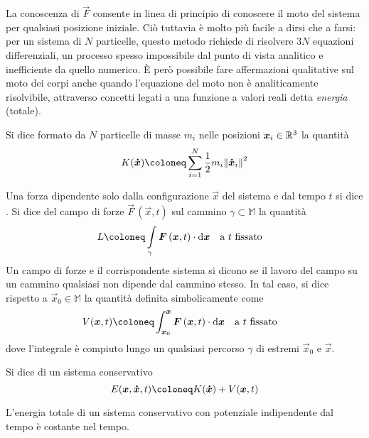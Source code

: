 La conoscenza di $\vec{F}$ consente in linea di principio di conoscere il moto del sistema per qualsiasi posizione iniziale. Ciò tuttavia è molto più facile a dirsi che a farsi: per un sistema di $N$ particelle, questo metodo richiede di risolvere $3N$ equazioni differenziali, un processo spesso impossibile dal punto di vista analitico e inefficiente da quello numerico. È però possibile fare affermazioni qualitative sul moto dei corpi anche quando l'equazione del moto non è analiticamente risolvibile, attraverso concetti legati a una funzione a valori reali detta \emph{energia} (totale).
\begin{definition}
  Si dice  formato da $N$ particelle di masse $m_i$ nelle posizioni $\boldsymbol{x}_i \in \mathbb{R}^3$ la quantità \begin{equation}
    K(\vec{\dot{x}}) \defeq \sum_{i=1}^{N} \frac{1}{2}m_i\norm{\vec{\dot{x}}_i}^2
  \end{equation} 
\end{definition}
\begin{definition}
  Una forza dipendente solo dalla configurazione $\vec{x}$ del sistema e dal tempo $t$ si dice . Si dice  del campo di forze $\vec{F}\, (\vec{x},t)$ sul cammino $\gamma \subset \mathbb{M}$ la quantità \begin{equation}
  L \defeq \int\limits_{\gamma} \vec{F}\,(\vec{x},t)\cdot \dd \vec{x} \qqtext{a $t$ fissato}
  \end{equation} 
  Un campo di forze e il corrispondente sistema si dicono  se il lavoro del campo su un cammino qualsiasi non dipende dal cammino stesso. In tal caso, si dice  rispetto a $\vec{x}_0 \in \mathbb{M}$ la quantità definita simbolicamente come \begin{equation}
  V(\vec{x},t) \defeq \int_{\vec{x}_0}^{\vec{x}} \vec{F}\,(\vec{x},t)\cdot \dd \vec{x} \qqtext{a $t$ fissato}
  \end{equation} 
  dove l'integrale è compiuto lungo un qualsiasi percorso $\gamma$ di estremi $\vec{x}_0$ e $\vec{x}$.
\end{definition}
\begin{definition}
  Si dice  di un sistema conservativo\begin{equation}
  E(\vec{x},\vec{\dot{x}},t) \defeq K(\vec{\dot{x}}) + V(\vec{x},t)
  \end{equation} 
\end{definition}
\begin{theorem} \label{thm:energyCons}
L'energia totale di un sistema conservativo con potenziale indipendente dal tempo è costante nel tempo.
\end{theorem}

